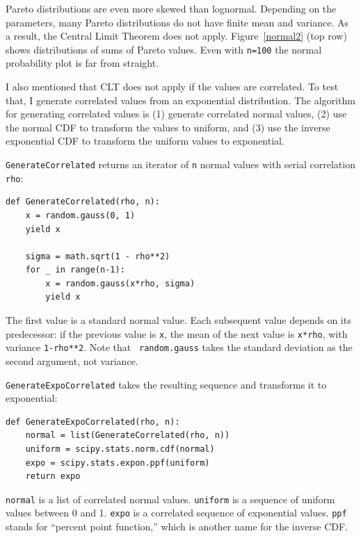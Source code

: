 \documentclass[12pt]{book}
\begin{document}
Pareto distributions are even more skewed than lognormal.  Depending
on the parameters, many Pareto distributions do not have finite mean
and variance.  As a result, the Central Limit Theorem does not apply.
Figure~\ref{normal2} (top row) shows distributions of sums of
Pareto values.  Even with {\tt n=100} the normal probability plot
is far from straight.

I also mentioned that CLT does not apply if the values are correlated.
To test that, I generate correlated values from an exponential
distribution.  The algorithm for generating correlated values is
(1) generate correlated normal values, (2) use the normal CDF
to transform the values to uniform, and (3) use the inverse
exponential CDF to transform the uniform values to exponential.

{\tt GenerateCorrelated} returns an iterator of {\tt n} normal values
with serial correlation {\tt rho}:

\begin{verbatim}
def GenerateCorrelated(rho, n):
    x = random.gauss(0, 1)
    yield x

    sigma = math.sqrt(1 - rho**2)
    for _ in range(n-1):
        x = random.gauss(x*rho, sigma)
        yield x
\end{verbatim}

The first value is a standard normal value.  Each subsequent value
depends on its predecessor: if the previous value is {\tt x}, the mean of
the next value is {\tt x*rho}, with variance {\tt 1-rho**2}.  Note that {\tt
  random.gauss} takes the standard deviation as the second argument,
not variance.

{\tt GenerateExpoCorrelated}
takes the resulting sequence and transforms it to exponential:

\begin{verbatim}
def GenerateExpoCorrelated(rho, n):
    normal = list(GenerateCorrelated(rho, n))
    uniform = scipy.stats.norm.cdf(normal)
    expo = scipy.stats.expon.ppf(uniform)
    return expo
\end{verbatim}

{\tt normal} is a list of correlated normal values.  {\tt uniform}
is a sequence of uniform values between 0 and 1.  {\tt expo} is
a correlated sequence of exponential values.
{\tt ppf} stands for ``percent point function,'' which is another
name for the inverse CDF.
\end{document}
